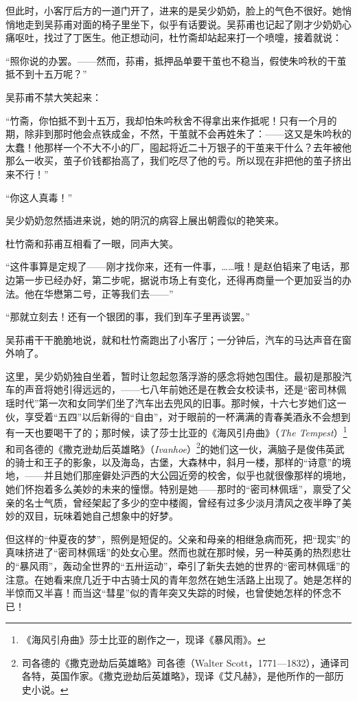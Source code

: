 \par 但此时，小客厅后方的一道门开了，进来的是吴少奶奶，脸上的气色不很好。她悄悄地走到吴荪甫对面的椅子里坐下，似乎有话要说。吴荪甫也记起了刚才少奶奶心痛呕吐，找过了丁医生。他正想动问，杜竹斋却站起来打一个喷嚏，接着就说：
\par “照你说的办罢。——然而，荪甫，抵押品单要干茧也不稳当，假使朱吟秋的干茧抵不到十五万呢？”
\par 吴荪甫不禁大笑起来：
\par “竹斋，你怕抵不到十五万，我却怕朱吟秋舍不得拿出来作抵呢！只有一个月的期，除非到那时他会点铁成金，不然，干茧就不会再姓朱了：——这又是朱吟秋的太蠢！他那样一个不大不小的厂，囤起将近二十万银子的干茧来干什么？去年被他那么一收买，茧子价钱都抬高了，我们吃尽了他的亏。所以现在非把他的茧子挤出来不行！”
\par “你这人真毒！”
\par 吴少奶奶忽然插进来说，她的阴沉的病容上展出朝霞似的艳笑来。
\par 杜竹斋和荪甫互相看了一眼，同声大笑。
\par “这件事算是定规了——刚才找你来，还有一件事，……哦！是赵伯韬来了电话，那边第一步已经办好，第二步呢，据说市场上有变化，还得再商量一个更加妥当的办法。他在华懋第二号，正等我们去——”
\par “那就立刻去！还有一个银团的事，我们到车子里再谈罢。”
\par 吴荪甫干干脆脆地说，就和杜竹斋跑出了小客厅；一分钟后，汽车的马达声音在窗外响了。
\par 这里，吴少奶奶独自坐着，暂时让忽起忽落浮游的感念将她包围住。最初是那股汽车的声音将她引得远远的，——七八年前她还是在教会女校读书，还是“密司林佩瑶时代”第一次和女同学们坐了汽车出去兜风的旧事。那时候，十六七岁她们这一伙，享受着“五四”以后新得的“自由”，对于眼前的一杯满满的青春美酒永不会想到有一天也要喝干了的；那时候，读了莎士比亚的《海风引舟曲》（\textsl{The Tempest}）\footnote{《海风引舟曲》莎士比亚的剧作之一，现译《暴风雨》。}和司各德的《撒克逊劫后英雄略》（\textsl{Ivanhoe}）\footnote{司各德的《撒克逊劫后英雄略》司各德（Walter Scott，1771—1832），通译司各特，英国作家。《撒克逊劫后英雄略》，现译《艾凡赫》，是他所作的一部历史小说。}的她们这一伙，满脑子是俊伟英武的骑士和王子的影象，以及海岛，古堡，大森林中，斜月一楼，那样的“诗意”的境地，——并且她们那座僻处沪西的大公园近旁的校舍，似乎也就很像那样的境地，她们怀抱着多么美妙的未来的憧憬。特别是她——那时的“密司林佩瑶”，禀受了父亲的名士气质，曾经架起了多少的空中楼阁，曾经有过多少淡月清风之夜半睁了美妙的双目，玩味着她自己想象中的好梦。
\par 但这样的“仲夏夜的梦”，照例是短促的。父亲和母亲的相继急病而死，把“现实”的真味挤进了“密司林佩瑶”的处女心里。然而也就在那时候，另一种英勇的热烈悲壮的“暴风雨”，轰动全世界的“五卅运动”，牵引了新失去她的世界的“密司林佩瑶”的注意。在她看来庶几近于中古骑士风的青年忽然在她生活路上出现了。她是怎样的半惊而又半喜！而当这“彗星”似的青年突又失踪的时候，也曾使她怎样的怀念不已！
